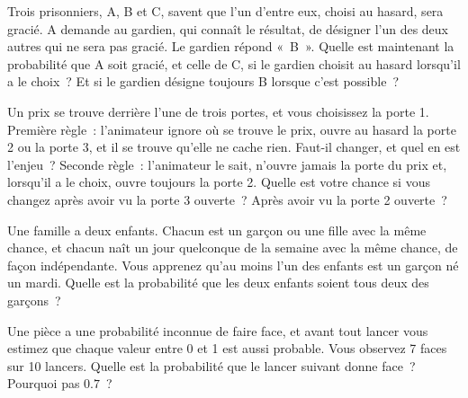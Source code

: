 \begin{question}\label{iq:iv1:conditional-probability-and-bayes:9}
Trois prisonniers, A, B et C, savent que l'un d'entre eux, choisi au hasard, sera gracié. A demande au gardien, qui connaît le résultat, de désigner l'un des deux autres qui ne sera pas gracié. Le gardien répond «~B~». Quelle est maintenant la probabilité que A soit gracié, et celle de C, si le gardien choisit au hasard lorsqu'il a le choix~? Et si le gardien désigne toujours B lorsque c'est possible~?
\end{question}

\begin{question}\label{iq:iv1:conditional-probability-and-bayes:10}
Un prix se trouve derrière l'une de trois portes, et vous choisissez la porte 1. Première règle~: l'animateur ignore où se trouve le prix, ouvre au hasard la porte 2 ou la porte 3, et il se trouve qu'elle ne cache rien. Faut-il changer, et quel en est l'enjeu~? Seconde règle~: l'animateur le sait, n'ouvre jamais la porte du prix et, lorsqu'il a le choix, ouvre toujours la porte 2. Quelle est votre chance si vous changez après avoir vu la porte 3 ouverte~? Après avoir vu la porte 2 ouverte~?
\end{question}

\begin{question}\label{iq:iv1:conditional-probability-and-bayes:11}
Une famille a deux enfants. Chacun est un garçon ou une fille avec la même chance, et chacun naît un jour quelconque de la semaine avec la même chance, de façon indépendante. Vous apprenez qu'au moins l'un des enfants est un garçon né un mardi. Quelle est la probabilité que les deux enfants soient tous deux des garçons~?
\end{question}

\begin{question}\label{iq:iv1:conditional-probability-and-bayes:12}
Une pièce a une probabilité inconnue de faire face, et avant tout lancer vous estimez que chaque valeur entre 0 et 1 est aussi probable. Vous observez 7 faces sur 10 lancers. Quelle est la probabilité que le lancer suivant donne face~? Pourquoi pas $0.7$~?
\end{question}

